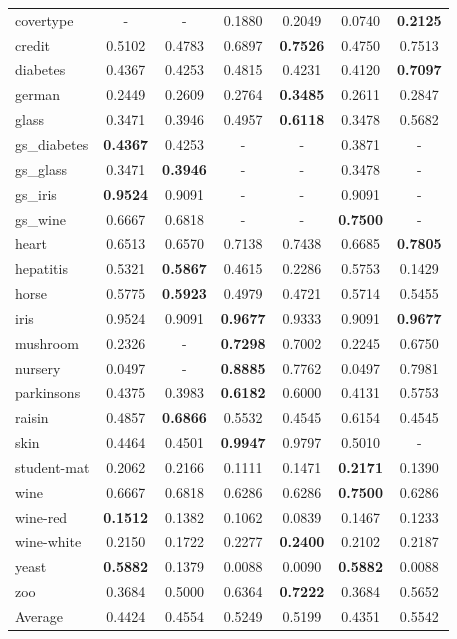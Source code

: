 \documentclass[11pt,a4paper,twocolumn]{article}
\begin{document}
\begin{table}[t]
\begin{tabular}{lcccccc}
        covertype & - & - & 0.1880 & 0.2049 & 0.0740 & \textbf{0.2125} \\
        credit & 0.5102 & 0.4783 & 0.6897 & \textbf{0.7526} & 0.4750 & 0.7513 \\
        diabetes & 0.4367 & 0.4253 & 0.4815 & 0.4231 & 0.4120 & \textbf{0.7097} \\
        german & 0.2449 & 0.2609 & 0.2764 & \textbf{0.3485} & 0.2611 & 0.2847 \\
        glass & 0.3471 & 0.3946 & 0.4957 & \textbf{0.6118} & 0.3478 & 0.5682 \\
        gs\_diabetes & \textbf{0.4367} & 0.4253 & - & - & 0.3871 & - \\
        gs\_glass & 0.3471 & \textbf{0.3946} & - & - & 0.3478 & - \\
        gs\_iris & \textbf{0.9524} & 0.9091 & - & - & 0.9091 & - \\
        gs\_wine & 0.6667 & 0.6818 & - & - & \textbf{0.7500} & - \\
        heart & 0.6513 & 0.6570 & 0.7138 & 0.7438 & 0.6685 & \textbf{0.7805} \\
        hepatitis & 0.5321 & \textbf{0.5867} & 0.4615 & 0.2286 & 0.5753 & 0.1429 \\
        horse & 0.5775 & \textbf{0.5923} & 0.4979 & 0.4721 & 0.5714 & 0.5455 \\
        iris & 0.9524 & 0.9091 & \textbf{0.9677} & 0.9333 & 0.9091 & \textbf{0.9677} \\
        mushroom & 0.2326 & - & \textbf{0.7298} & 0.7002 & 0.2245 & 0.6750 \\
        nursery & 0.0497 & - & \textbf{0.8885} & 0.7762 & 0.0497 & 0.7981 \\
        parkinsons & 0.4375 & 0.3983 & \textbf{0.6182} & 0.6000 & 0.4131 & 0.5753 \\
        raisin & 0.4857 & \textbf{0.6866} & 0.5532 & 0.4545 & 0.6154 & 0.4545 \\
        skin & 0.4464 & 0.4501 & \textbf{0.9947} & 0.9797 & 0.5010 & - \\
        student-mat & 0.2062 & 0.2166 & 0.1111 & 0.1471 & \textbf{0.2171} & 0.1390 \\
        wine & 0.6667 & 0.6818 & 0.6286 & 0.6286 & \textbf{0.7500} & 0.6286 \\
        wine-red & \textbf{0.1512} & 0.1382 & 0.1062 & 0.0839 & 0.1467 & 0.1233 \\
        wine-white & 0.2150 & 0.1722 & 0.2277 & \textbf{0.2400} & 0.2102 & 0.2187 \\
        yeast & \textbf{0.5882} & 0.1379 & 0.0088 & 0.0090 & \textbf{0.5882} & 0.0088 \\
        zoo & 0.3684 & 0.5000 & 0.6364 & \textbf{0.7222} & 0.3684 & 0.5652 \\
        \midrule
        Average & 0.4424 & 0.4554 & 0.5249 & 0.5199 & 0.4351 & 0.5542 \\
\bottomrule
\end{tabular}
\end{table}
\end{document}
